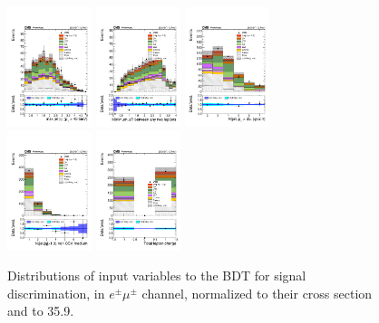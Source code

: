 \begin{figure} [!h]
  \includegraphics[width=0.22\textwidth]{figures/signalregion_2lss/emu/maxEtaJet25_40.pdf}
  \includegraphics[width=0.22\textwidth]{figures/signalregion_2lss/emu/minDRll.pdf} 
  \includegraphics[width=0.22\textwidth]{figures/signalregion_2lss/emu/nJet25.pdf} \\
  \includegraphics[width=0.22\textwidth]{figures/signalregion_2lss/emu/nJetEta1_40.pdf}
  \includegraphics[width=0.22\textwidth]{figures/signalregion_2lss/emu/totCharge.pdf}
\caption{Distributions of input variables to the BDT for signal discrimination, in $e^{\pm}\mu^{\pm}$ channel, normalized to their cross section and to 35.9\fbinv.}
\label{fig:input_vars_2lss_xsec_emu}
\end{figure}

